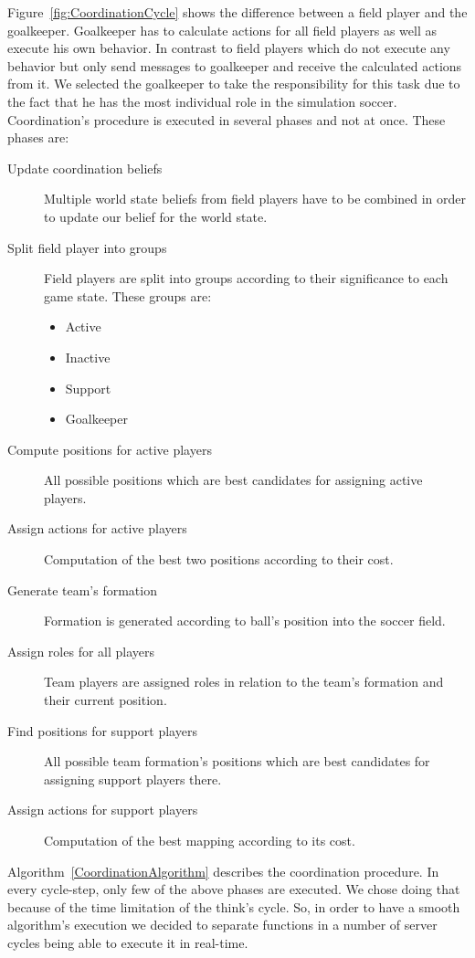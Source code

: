 Figure~\ref{fig:CoordinationCycle} shows the difference between a field player and the goalkeeper. Goalkeeper has to calculate actions for all field players as well as execute his own behavior. In contrast to field players which do not execute any behavior but only send messages to goalkeeper and receive the calculated actions from it. We selected the goalkeeper to take the responsibility for this task due to the fact that he has the most individual role in the simulation soccer. Coordination's procedure is executed in several phases and not at once. These phases are:
\begin{description}
\item[Update coordination beliefs] Multiple world state beliefs from field players have to be combined in order to update our belief for the world state.
\item[Split field player into groups] Field players are split into groups according to their significance to each game state. These groups are:
\begin{itemize}
\item Active
\item Inactive
\item Support
\item Goalkeeper
\end{itemize}
\item[Compute positions for active players] All possible positions which are best candidates for assigning active players.
\item[Assign actions for active players] Computation of the best two positions according to their cost.
\item[Generate team's formation] Formation is generated according to ball's position into the soccer field.
\item[Assign roles for all players] Team players are assigned roles in relation to the team's formation and their current position.
\item[Find positions for support players] All possible team formation's positions which are best candidates for assigning support players there.
\item[Assign actions for support players] Computation of the best mapping according to its cost.
\end{description}


Algorithm~\ref{CoordinationAlgorithm} describes the coordination procedure. In every cycle-step, only few of the above phases are executed. We chose doing that because of the time limitation of the think's cycle. So, in order to have a smooth algorithm's execution we decided to separate functions in a number of server cycles being able to execute it in real-time.

